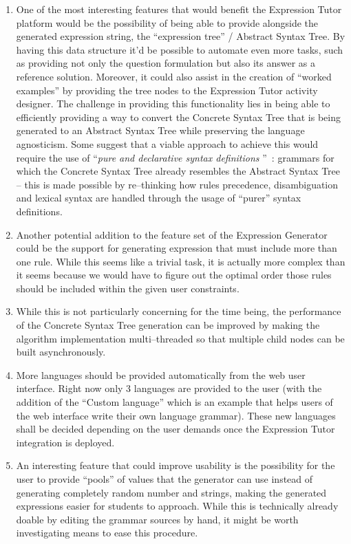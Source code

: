 \documentclass[]{usiinfbachelorproject}
\begin{document}
\begin{enumerate}
\item One of the most interesting features that would benefit the
      Expression Tutor platform would be the possibility of being able to
      provide alongside the generated expression string, the ``expression tree''
      / Abstract Syntax Tree. By having this data structure it'd be possible to
      automate even more tasks, such as providing not only the question
      formulation but also its answer as a reference solution. Moreover, it
      could also assist in the creation of ``worked examples'' by providing
      the tree nodes to the Expression Tutor activity designer.
      The challenge in providing this functionality lies in being able to
      efficiently providing a way to convert the Concrete Syntax Tree that is
      being generated to an Abstract Syntax Tree while preserving the language
      agnosticism. Some suggest that a viable approach to achieve this would
      require the use of ``\textit{pure and declarative syntax definitions
      }''~\cite{paradiselost}: grammars for which the Concrete Syntax Tree
      already resembles the Abstract Syntax Tree – this is made possible by
      re–thinking how rules precedence, disambiguation and lexical syntax are
      handled through the usage of ``purer'' syntax definitions.
\item Another potential addition to the feature set of the Expression Generator
      could be the support for generating expression that must include more
      than one rule. While this seems like a trivial task, it is actually more
      complex than it seems because we would have to figure out the optimal
      order those rules should be included within the given user constraints.
\item While this is not particularly concerning for the time being, the
      performance of the Concrete Syntax Tree generation can be improved by
      making the algorithm implementation multi–threaded so that multiple child
      nodes can be built asynchronously.
\item More languages should be provided automatically from the web user
      interface. Right now only 3 languages are provided to the user (with
      the addition of the ``Custom language'' which is an example that helps
      users of the web interface write their own language grammar). These new
      languages shall be decided depending on the user demands once the
      Expression Tutor integration is deployed.
\item An interesting feature that could improve usability is the possibility
      for the user to provide ``pools'' of values that the generator can use
      instead of generating completely random number and strings, making the
      generated expressions easier for students to approach. While this is
      technically already doable by editing the grammar sources by hand, it
      might be worth investigating means to ease this procedure.
\end{enumerate}
\end{document}
